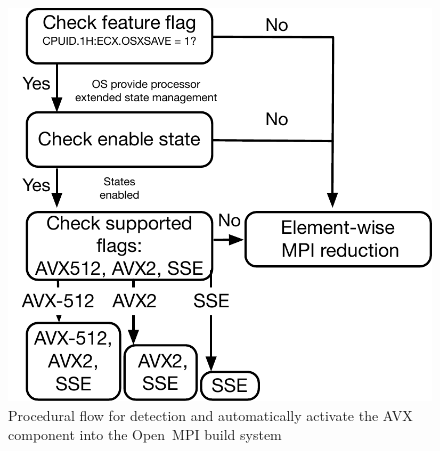 \documentclass[5p,times,twocolumn]{elsarticle}
\newcommand{\ompi}[0]{Open~MPI\xspace}
\begin{document}
\begin{figure}[h]
    \centering
    \includegraphics[scale=.45]{avx-graph.pdf}
    \caption{Procedural flow for detection and automatically activate the AVX component into the \ompi build system}
    \label{fig:512flow}
\end{figure}

\end{document}
